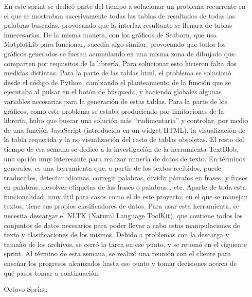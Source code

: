 En este sprint se dedicó parte del tiempo a solucionar un problema recurrente en el que se mostraban sucesivamente todas las tablas de resultados de todas las palabras buscadas, provocando que la interfaz resultante se llenara de tablas innecesarias. De la misma manera, con los gráficos de Seaborn, que usa MatplotLib para funcionar, sucedía algo similar, provocando que todos los gráficos generados se fueran acumulando en una misma zona de dibujado que comparten por requisitos de la librería.
Para solucionar esto hicieron falta dos medidas distintas. Para la parte de las tablas html, el problema se solucionó desde el código de Python, cambiando el planteamiento de la función que se ejecutaba al pulsar en el botón de búsqueda, y haciendo globales algunas variables necesarias para la generación de estas tablas. Para la parte de los gráficos, como este problema se estaba produciendo por limitaciones de la librería, hubo que buscar una solución más “rudimentaria” y controlar, por medio de una función JavaScript (introducida en un widget HTML), la visualización de la tabla requerida y la no visualización del resto de tablas obsoletas.
El resto del tiempo de esa semana se dedicó a la investigación de la herramienta TextBlob, una opción muy interesante para realizar minería de datos de texto. En términos generales, es una herramienta que, a partir de los textos recibidos, puede traducirles, detectar idiomas, corregir palabras, dividir párrafos en frases, y frases en palabras, devolver etiquetas de las frases o palabras… etc. Aparte de toda esta funcionalidad, muy útil para casos como el de este proyecto, en el que se manejan textos, tiene sus propios clasificadores de datos. 
Para usar esta herramienta, se necesita descargar el NLTK (Natural Language ToolKit), que contiene todos los conjuntos de datos necesarios para poder llevar a cabo estas manipulaciones de texto y clasificaciones de los mismos. 
Debido a problemas con la descarga y tamaño de los archivos, se cerró la tarea en ese punto, y se retomó en el siguiente sprint.
Al término de esta semana, se realizó una reunión con el cliente para enseñar los progresos alcanzados hasta ese punto y tomar decisiones acerca de qué pasos tomar a continuación. 

Octavo Sprint:

